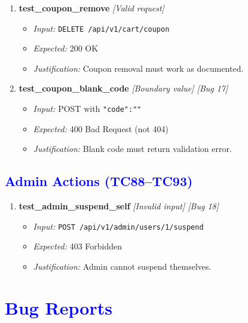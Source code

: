 \documentclass{article}
\begin{document}
\begin{enumerate}[resume, label=\textbf{TC\arabic*.}]
\item \textbf{test\_coupon\_remove} \textit{[Valid request]}
\begin{itemize}[noitemsep]
  \item \textit{Input:} \texttt{DELETE /api/v1/cart/coupon}
  \item \textit{Expected:} 200 OK
  \item \textit{Justification:} Coupon removal must work as documented.
\end{itemize}

\item \textbf{test\_coupon\_blank\_code} \textit{[Boundary value] \textit{[Bug 17]}}
\begin{itemize}[noitemsep]
  \item \textit{Input:} POST with \texttt{"code":""}
  \item \textit{Expected:} 400 Bad Request (not 404)
  \item \textit{Justification:} Blank code must return validation error.
\end{itemize}
\end{enumerate}

\subsection*{\textcolor{blue}{Admin Actions (TC88--TC93)}}
\begin{enumerate}[resume, label=\textbf{TC\arabic*.}]

\item \textbf{test\_admin\_suspend\_self} \textit{[Invalid input] \textit{[Bug 18]}}
\begin{itemize}[noitemsep]
  \item \textit{Input:} \texttt{POST /api/v1/admin/users/1/suspend}
  \item \textit{Expected:} 403 Forbidden
  \item \textit{Justification:} Admin cannot suspend themselves.
\end{itemize}
\end{enumerate}

\section*{\textcolor{blue}{Bug Reports}}

\renewcommand{\labelitemi}{\textcolor{red}{$\blacktriangleright$}}
\end{document}
